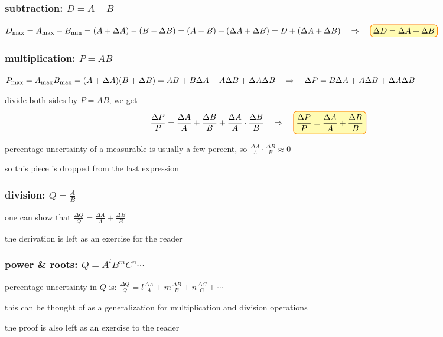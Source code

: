 \subsubsection*{subtraction: $D=A-B$}

$D_\tmax = A_\tmax - B_\tmin = (A + \Delta A) - (B - \Delta B) = (A-B) + (\Delta A + \Delta B)= D + (\Delta A + \Delta B) \RA \boxed{\Delta D = \Delta A + \Delta B}$

\subsubsection*{multiplication: $P=AB$}

$P_{\text{max}} = A_{\text{max}} B_{\text{max}} = (A + \Delta A)(B + \Delta B) = AB + B\Delta A + A\Delta B + \Delta A \Delta B \quad \Rightarrow \quad \Delta P =  B\Delta A + A\Delta B + \Delta A \Delta B$

divide both sides by $P=AB$, we get
\begin{equation*}
\frac{\Delta P}{P} = \frac{\Delta A}{A} + \frac{\Delta B}{B} + \frac{\Delta A}{A}\cdot\frac{\Delta B}{B} \RA \boxed{\frac{\Delta P}{P} = \frac{\Delta A}{A} + \frac{\Delta B}{B}}
\end{equation*}

percentage uncertainty of a measurable is usually a few percent, so $\frac{\Delta A}{A}\cdot\frac{\Delta B}{B} \approx 0$

so this piece is dropped from the last expression

\subsubsection*{division: $Q=\frac{A}{B}$}

one can show that $\boxed{\frac{\Delta Q}{Q} = \frac{\Delta A}{A} + \frac{\Delta B}{B}}$

the derivation is left as an exercise for the reader

\subsubsection*{power \& roots: $Q=A^l B^m C^n\cdots$}

percentage uncertainty in $Q$ is: $\frac{\Delta Q}{Q} = l\frac{\Delta A}{A} + m\frac{\Delta B}{B} + n\frac{\Delta C}{C} +\cdots$

this can be thought of as a generalization for multiplication and division operations

the proof is also left as an exercise to the reader

